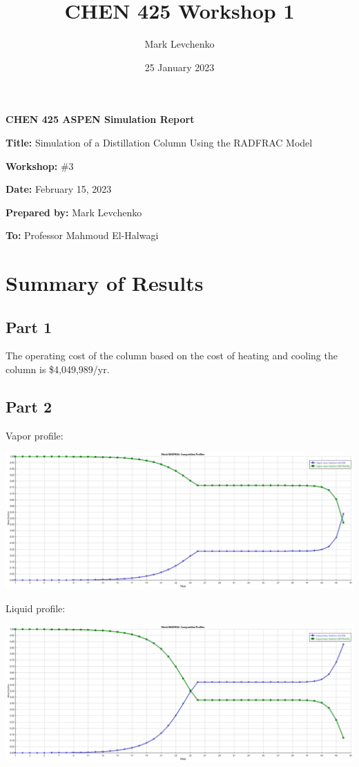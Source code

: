 \documentclass[12pt]{article}
\title{CHEN 425 Workshop 1}
\author{Mark Levchenko}
\date{25 January 2023}
\begin{document}


\textbf{CHEN 425 ASPEN Simulation Report}

\textbf{Title:} Simulation of a Distillation Column Using the RADFRAC Model

\textbf{Workshop:} \#3

\textbf{Date:} February 15, 2023

\textbf{Prepared by:} Mark Levchenko

\textbf{To:} Professor Mahmoud El-Halwagi

\section{Summary of Results}

\subsection{Part 1}

The operating cost of the column based on the cost of heating and cooling the column is \$4,049,989/yr.

\subsection{Part 2}

Vapor profile:

\includegraphics[scale=0.35]{vapi.png}

Liquid profile:

\includegraphics[scale=0.35]{liqi.png}
\end{document}
